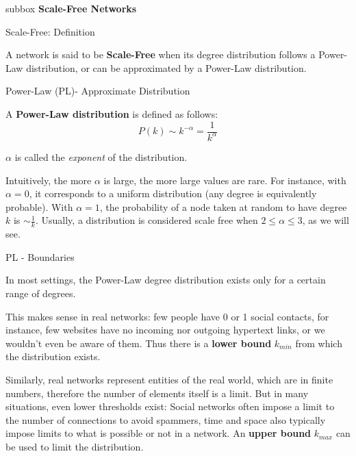 \documentclass[a4paper,11pt]{book}
\begin{document}

\newpage



\begin{subbox}{subbox}{}
\centering
\Large{\textbf{Scale-Free Networks}}
\end{subbox}

\begin{textbox}{Scale-Free: Definition}

A network is said to be \textbf{Scale-Free} when its degree distribution follows a Power-Law distribution, or can be approximated by a Power-Law distribution. 

\end{textbox}

\begin{textbox}{Power-Law (PL)- Approximate Distribution}

A \textbf{Power-Law distribution} is defined as follows:
\[
P(k) \sim k^{-\alpha} = \frac{1}{k^\alpha}
\]

$\alpha$ is called the \textit{exponent} of the distribution.

Intuitively, the more $\alpha$ is large, the more large values are rare. For instance, with $\alpha=0$, it corresponds to a uniform distribution (any degree is equivalently probable). With $\alpha=1$, the probability of a node taken at random to have degree $k$ is $\sim \frac{1}{k}$. Usually, a distribution is considered scale free when $2\leq \alpha\leq 3$, as we will see.

\end{textbox}


\begin{textbox}{PL - Boundaries}

In most settings, the Power-Law degree distribution exists only for a certain range of degrees. 

This makes sense in real networks: few people have 0 or 1 social contacts, for instance, few websites have no incoming nor outgoing hypertext links, or we wouldn't even be aware of them. Thus there is a \textbf{lower bound} $k_{min}$ from which the distribution exists. 

Similarly, real networks represent entities of the real world, which are in finite numbers, therefore the number of elements itself is a limit. But in many situations, even lower thresholds exist: Social networks often impose a limit to the number of connections to avoid spammers, time and space also typically impose limits to what is possible or not in a network. An \textbf{upper bound} $k_{max}$ can be used to limit the distribution. 

\end{textbox}
\end{document}
